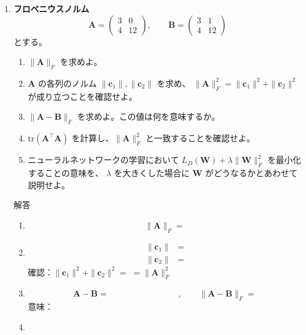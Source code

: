 \documentclass[a4paper,dvipdfmx]{jsarticle}
\newcommand{\提出期限}{2026年10月12日（月）}
\newcommand{\学籍番号}{0000000}
\newcommand{\氏名}{氏名を書く}
\newcommand{\提出日}{2026年10月12日}
\newenvironment{answer}{\begin{itembox}[l]{解答}}{\end{itembox}}
\begin{document}
\begin{enumerate}
  \item \textbf{フロベニウスノルム}\quad
    \begin{equation*}
      \bm{A} = \begin{pmatrix} 3 & 0 \\ 4 & 12 \end{pmatrix}, \qquad
      \bm{B} = \begin{pmatrix} 3 & 1 \\ 4 & 12 \end{pmatrix}
    \end{equation*}
    とする。
    \begin{enumerate}
      \item $\|\bm{A}\|_F$ を求めよ。
      \item $\bm{A}$ の各列のノルム $\|\bm{c}_1\|, \|\bm{c}_2\|$ を求め、
        $\|\bm{A}\|_F^2 = \|\bm{c}_1\|^2 + \|\bm{c}_2\|^2$ が成り立つことを確認せよ。
      \item $\|\bm{A} - \bm{B}\|_F$ を求めよ。この値は何を意味するか。
      \item $\mathrm{tr}(\bm{A}^\top \bm{A})$ を計算し、$\|\bm{A}\|_F^2$ と一致することを確認せよ。
      \item ニューラルネットワークの学習において
        $L_D(\bm{W}) + \lambda \|\bm{W}\|_F^2$ を最小化することの意味を、
        $\lambda$ を大きくした場合に $\bm{W}$ がどうなるかとあわせて説明せよ。
    \end{enumerate}
    \begin{answer}
      \begin{enumerate}
        \item
          \begin{equation*}
            \|\bm{A}\|_F =
          \end{equation*}
        \item
          \begin{align*}
            \|\bm{c}_1\| &= \\
            \|\bm{c}_2\| &=
          \end{align*}
          確認：$\|\bm{c}_1\|^2 + \|\bm{c}_2\|^2 = $ \phantom{XXXXXX} $= \|\bm{A}\|_F^2$
        \item
          \begin{equation*}
            \bm{A} - \bm{B} = \phantom{XXXXXXXXXX}, \qquad \|\bm{A}-\bm{B}\|_F =
          \end{equation*}
          意味：
        \item
          \begin{equation*}

\end{equation*}
\end{enumerate}
\end{answer}
\end{enumerate}
\end{document}
